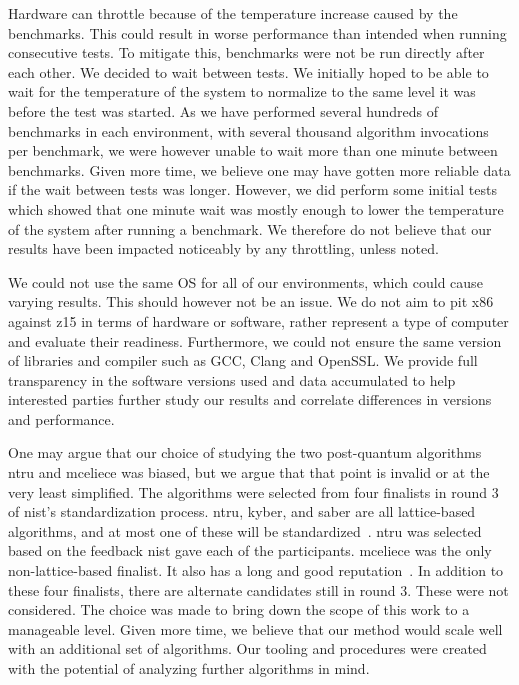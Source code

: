 Hardware can throttle because of the temperature increase caused by the benchmarks. This could result in worse performance than intended when running consecutive tests. To mitigate this, benchmarks were not be run directly after each other. We decided to wait between tests. We initially hoped to be able to wait for the temperature of the system to normalize to the same level it was before the test was started. As we have performed several hundreds of benchmarks in each environment, with several thousand algorithm invocations per benchmark, we were however unable to wait more than one minute between benchmarks. Given more time, we believe one may have gotten more reliable data if the wait between tests was longer. However, we did perform some initial tests which showed that one minute wait was mostly enough to lower the temperature of the system after running a benchmark. We therefore do not believe that our results have been impacted noticeably by any throttling, unless noted. 

We could not use the same OS for all of our environments, which could cause varying results. This should however not be an issue. We do not aim to pit \gls{x86} against \gls{z15} in terms of hardware or software, rather represent a type of computer and evaluate their readiness. Furthermore, we could not ensure the same version of libraries and compiler such as GCC, Clang and OpenSSL. We provide full transparency in the software versions used and data accumulated to help interested parties further study our results and correlate differences in versions and performance.

One may argue that our choice of studying the two \gls{post-quantum} algorithms \gls{ntru} and \gls{mceliece} was biased, but we argue that that point is invalid or at the very least simplified. The algorithms were selected from four finalists in round 3 of \gls{nist}'s standardization process. \gls{ntru}, \gls{kyber}, and \gls{saber} are all lattice-based algorithms, and at most one of these will be standardized~\cite{nist2020}. \gls{ntru} was selected based on the feedback \gls{nist} gave each of the participants. \gls{mceliece} was the only non-lattice-based finalist. It also has a long and good reputation~\cite{nist2020}. In addition to these four finalists, there are alternate candidates still in round 3. These were not considered. The choice was made to bring down the scope of this work to a manageable level. Given more time, we believe that our method would scale well with an additional set of algorithms. Our tooling and procedures were created with the potential of analyzing further algorithms in mind.

